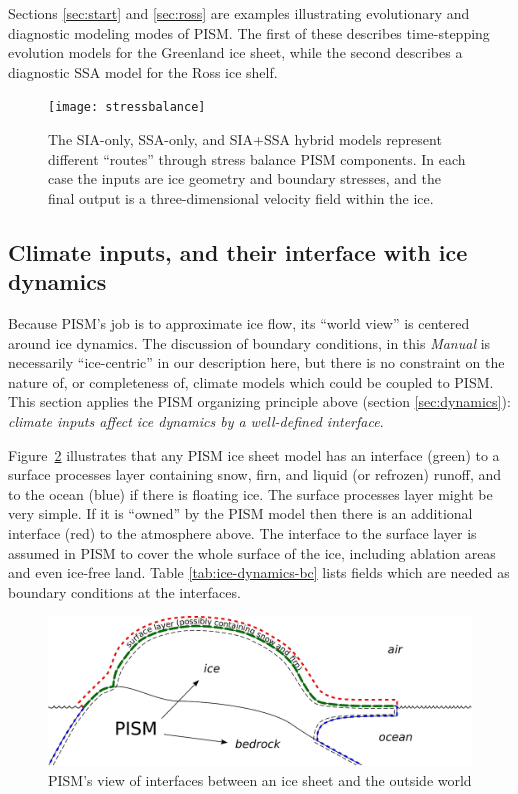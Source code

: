 Sections \ref{sec:start} and \ref{sec:ross} are examples illustrating evolutionary and diagnostic modeling modes of PISM.  The first of these describes time-stepping evolution models for the Greenland ice sheet, while the second describes a diagnostic SSA model for the Ross ice shelf.


\begin{figure}
  \centering
  \texttt{[image: stressbalance]}
  \caption{The SIA-only, SSA-only, and SIA+SSA hybrid models represent different ``routes'' through stress balance PISM components.  In each case the inputs are ice geometry and boundary stresses, and the final output is a three-dimensional velocity field within the ice.}
  \label{fig:stressbalance}
\end{figure}


\subsection{Climate inputs, and their interface with ice dynamics}
\label{sec:climate-inputs}  

Because PISM's job is to approximate ice flow, its ``world view'' is centered around ice dynamics.  The discussion of boundary conditions, in this \emph{Manual} is necessarily ``ice-centric'' in our description here, but there is no constraint on the nature of, or completeness of, climate models which could be coupled to PISM.  This section applies the PISM organizing principle above (section \ref{sec:dynamics}): \emph{climate inputs affect ice dynamics by a well-defined interface}.

Figure~\ref{fig:climate-inputs} illustrates that any PISM ice sheet model has an interface (green) to a surface processes layer containing snow, firn, and liquid (or refrozen) runoff, and to the ocean (blue) if there is floating ice.  The surface processes layer might be very simple.  If it is ``owned'' by the PISM model then there is an additional interface (red) to the atmosphere above.  The interface to the surface layer is assumed in PISM to cover the whole surface of the ice, including ablation areas and even ice-free land.  Table \ref{tab:ice-dynamics-bc} lists fields which are needed as boundary conditions at the interfaces.

\begin{figure}
  \centering
  \includegraphics[width=6in]{figs/climate-cartoon.pdf}
  \caption{PISM's view of interfaces between an ice sheet and the outside world}
  \label{fig:climate-inputs}
\end{figure}

